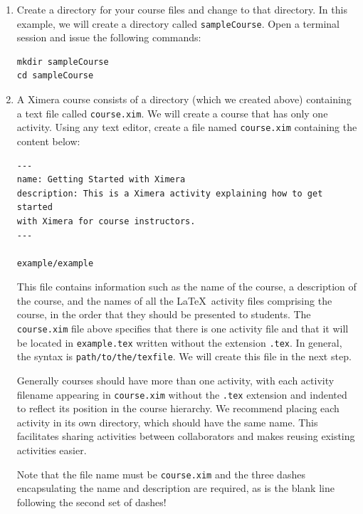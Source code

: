 \documentclass{ximera}
\begin{document}
\begin{enumerate}
\item Create a directory for your course files
and change to that directory.
In this example, we will create a directory called \verb!sampleCourse!.
Open a terminal session and issue the following commands:
\begin{center}
\begin{verbatim}
mkdir sampleCourse
cd sampleCourse 
\end{verbatim}
\end{center}
\item A Ximera course consists of a directory (which we created above)
containing a text file called \verb!course.xim!. 
We will create a course that has only one activity.
Using any text editor,
create a file named \verb!course.xim! containing the content below:

\begin{verbatim}
---
name: Getting Started with Ximera
description: This is a Ximera activity explaining how to get started
with Ximera for course instructors.
---

example/example
\end{verbatim}

\begin{remark}
This file contains information such as
the name of the course, a description of the course,
and the names of all the \LaTeX\ activity files 
comprising the course, in the order
that they should be presented to students.
The \verb!course.xim! file above specifies that 
there is one activity file 
and that it will be located in \verb!example.tex!
written without the extension \verb!.tex!. 
In general, the syntax is \verb!path/to/the/texfile!.
We will
create this file in the next step.


Generally courses should have more than one activity,
with each activity filename appearing in \verb!course.xim!
without the \verb!.tex! extension and
indented to reflect its position in the course hierarchy.
We recommend placing each
activity in its own directory, which should have the same name.
This facilitates
sharing activities between collaborators and makes reusing existing
activities easier.
\end{remark}

\begin{warning}
Note that the file name must be \verb!course.xim! and 
the three dashes encapsulating the name and description
are required, as is the blank line following the second set of dashes!
\end{warning}


\end{enumerate}
\end{document}
